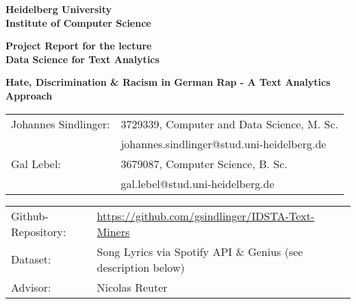 \documentclass[
     12pt,         %
     a4paper,      %
     BCOR10mm,     %
     DIV14,        %
     ]{article}
\begin{document}
\begin{titlepage}


\begin{center}
\vspace*{2cm}
\textbf{ 
\Large Heidelberg University\\
\smallskip
\Large Institute of Computer Science\\
\smallskip
}

\vspace{3cm}

\textbf{\large Project Report for the lecture \\  Data Science for Text Analytics}

\vspace{0.5\baselineskip}
{\huge
\textbf{Hate, Discrimination \& Racism in German Rap - A Text Analytics Approach}
}
\end{center}

\vfill 

{\large
\begin{tabular}[l]{ll}
Johannes Sindlinger: & 3729339, Computer and Data Science, M. Sc.\\
  & johannes.sindlinger@stud.uni-heidelberg.de\\
Gal Lebel: & 3679087, Computer Science, B. Sc. \\
  & gal.lebel@stud.uni-heidelberg.de\\
  
\end{tabular}
}

\vspace{1cm}
\begin{tabular}[l]{ll}
Github-Repository: & \url{https://github.com/gsindlinger/IDSTA-Text-Miners} \\
Dataset: & Song Lyrics via Spotify API \& Genius \cite{genius} (see description below) \\
Advisor: & Nicolas Reuter
\end{tabular}
\end{titlepage}






















\end{document}
